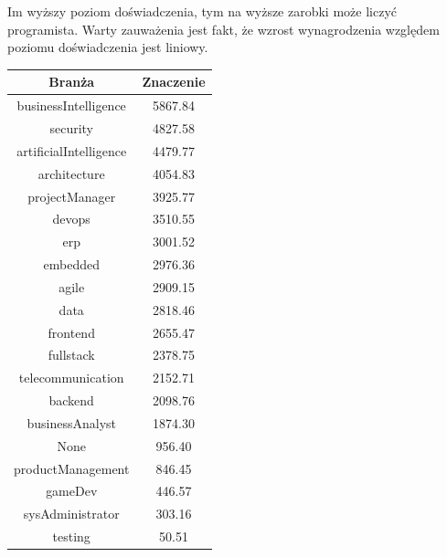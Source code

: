 \documentclass{article}
\begin{document}
Im wyższy poziom doświadczenia, tym na wyższe zarobki może liczyć programista.
Warty zauważenia jest fakt, że wzrost wynagrodzenia względem poziomu doświadczenia jest liniowy.

\begin{table}[H]
    \centering
    \begin{minipage}{0.45\textwidth}
        \centering
        \begin{tabular}{|c|c|}
            \hline
            \textbf{Branża}        & \textbf{Znaczenie} \\ \hline
            businessIntelligence   & 5867.84            \\ \hline
            security               & 4827.58            \\ \hline
            artificialIntelligence & 4479.77            \\ \hline
            architecture           & 4054.83            \\ \hline
            projectManager         & 3925.77            \\ \hline
            devops                 & 3510.55            \\ \hline
            erp                    & 3001.52            \\ \hline
            embedded               & 2976.36            \\ \hline
            agile                  & 2909.15            \\ \hline
            data                   & 2818.46            \\ \hline
            frontend               & 2655.47            \\ \hline
            fullstack              & 2378.75            \\ \hline
            telecommunication      & 2152.71            \\ \hline
            backend                & 2098.76            \\ \hline
            businessAnalyst        & 1874.30            \\ \hline
            None                   & 956.40             \\ \hline
            productManagement      & 846.45             \\ \hline
            gameDev                & 446.57             \\ \hline
            sysAdministrator       & 303.16             \\ \hline
            testing                & 50.51              \\ \hline

\end{tabular}
\end{minipage}
\end{table}
\end{document}
